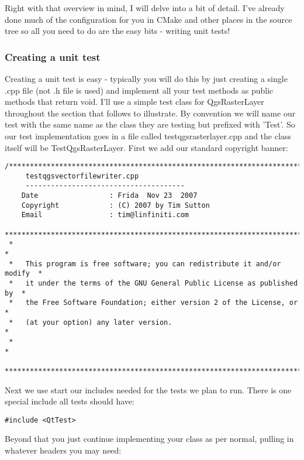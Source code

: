 Right with that overview in mind, I will delve into a bit of detail. I've
already done much of the configuration for you in CMake and other places in the
source tree so all you need to do are the easy bits - writing unit tests!

\subsubsection{Creating a unit test}
Creating a unit test is easy - typically you will do this by just creating a
single .cpp file (not .h file is used) and implement all your test methods as
public methods that return void. I'll use a simple test class for
QgsRasterLayer throughout the section that follows to illustrate. By convention
we will name our test with the same name as the class they are testing but
prefixed with 'Test'.  So our test implementation goes in a file called
testqgsrasterlayer.cpp and the class itself will be TestQgsRasterLayer. First
we add our standard copyright banner:

\begin{verbatim}
/***************************************************************************
     testqgsvectorfilewriter.cpp
     --------------------------------------
    Date                 : Frida  Nov 23  2007
    Copyright            : (C) 2007 by Tim Sutton
    Email                : tim@linfiniti.com
 ***************************************************************************
 *                                                                         *
 *   This program is free software; you can redistribute it and/or modify  *
 *   it under the terms of the GNU General Public License as published by  *
 *   the Free Software Foundation; either version 2 of the License, or     *
 *   (at your option) any later version.                                   *
 *                                                                         *
 ***************************************************************************/
\end{verbatim}

Next we use start our includes needed for the tests we plan to run. There is 
one special include all tests should have:

\begin{verbatim}
#include <QtTest>
\end{verbatim}

Beyond that you just continue implementing your class as per normal, pulling 
in whatever headers you may need:

